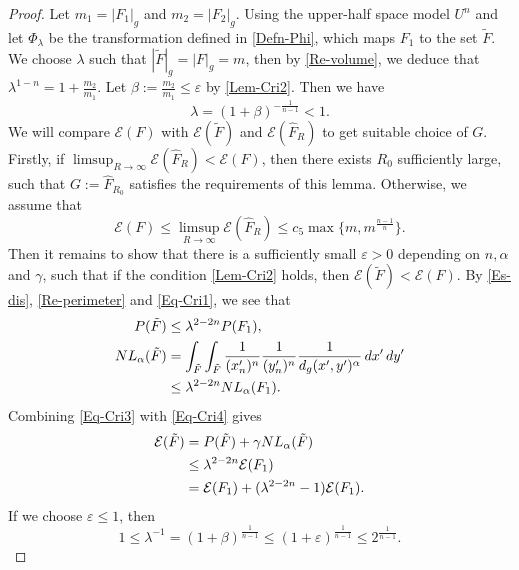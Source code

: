 \documentclass[11pt,reqno]{amsart}
\theoremstyle{definition}
\theoremstyle{remark}
\numberwithin{equation}{section}
\renewcommand{\(}{\left(}
\renewcommand{\)}{\right)}
\renewcommand{\widetilde}{\tilde}
\renewcommand{\-}{\overline}
\begin{document}
\begin{proof}
 Let $m_1=|F_1|_g$ and $m_2=|F_2|_g$. Using the upper-half space model $U^n$ and let $\Phi_{\lambda}$ be the transformation defined in \eqref{Defn-Phi}, which maps $F_1$ to the set $\widetilde{F}$. We choose $\lambda$ such that $|\widetilde{F}|_g=|F|_g=m$, then by \eqref{Re-volume}, we deduce that $\lambda^{1-n}=1+\frac{m_2}{m_1}$. Let $\beta:=\frac{m_2}{m_1}\leq\varepsilon$ by \eqref{Lem-Cri2}. Then we have 
 \begin{equation}\label{Eq-Cri1}
 	\lambda=(1+\beta)^{-\frac{1}{n-1}}<1.
 \end{equation}
  We will compare $\mathcal{E}(F)$ with $\mathcal{E}(\widetilde{F})$ and $\mathcal{E}({\widehat{F}_R})$ to get suitable choice of $G$. Firstly, if $\limsup_{R\to\infty}\mathcal{E}({\widehat{F}_R})<\mathcal{E}(F)$, then there exists $R_0$ sufficiently large, such that $G:=\widehat{F}_{R_0}$ satisfies the requirements of this lemma. Otherwise, we assume that 
  \begin{equation}\label{Eq-Cri2}
  	\mathcal{E}(F)\leq \limsup_{R\to\infty}\mathcal{E}({\widehat{F}_R})\leq c_5\max\{m,m^{\frac{n-1}{n}}\}.
  \end{equation}
  Then it remains to show that there is a sufficiently small $\varepsilon>0$ depending on $n,\alpha$ and $\gamma$, such that if the condition \eqref{Lem-Cri2} holds, then $\mathcal{E}(\widetilde{F})<\mathcal{E}(F)$. By \eqref{Es-dis}, \eqref{Re-perimeter} and \eqref{Eq-Cri1}, we see that 
  \begin{align}
  	P(\widetilde{F})&\leq\lambda^{2-2n}P(F_1),\label{Eq-Cri3}\\
  	NL_{\alpha}(\widetilde{F})&=\int_{\widetilde{F}}\int_{\widetilde{F}}\frac{1}{(x_n')^n}\frac{1}{(y_n')^n}\frac{1}{d_g(x',y')^{\alpha}}\,dx'\,dy'\notag\\
  	&\leq {\lambda}^{2-2n} NL_{\alpha}(F_1).\label{Eq-Cri4}
  \end{align} 
  Combining \eqref{Eq-Cri3} with \eqref{Eq-Cri4} gives
  \begin{align}
  	\mathcal{E}(\widetilde{F})&=P(\widetilde{F})+\gamma NL_{\alpha}(\widetilde{F})\notag\\
  	&\leq {\lambda}^{2-2n} \mathcal{E}(F_1)\notag\\
  	&=\mathcal{E}(F_1)+({\lambda}^{2-2n}-1)\mathcal{E}(F_1).\label{Eq-Cri5}
  \end{align}
  If we choose $\varepsilon\leq 1$, then 
  \begin{equation*}
  	    1\leq\lambda^{-1}=(1+\beta)^{\frac{1}{n-1}}\leq (1+\varepsilon)^{\frac{1}{n-1}}\leq 2^{\frac{1}{n-1}}.

\end{equation*}
\end{proof}
\end{document}
